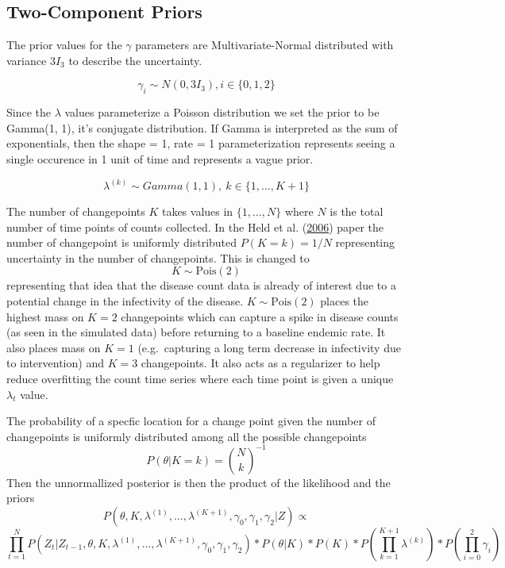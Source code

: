 \documentclass[11pt,a4paper]{article}
\numberwithin{equation}{section}
\begin{document}
\hypertarget{two-component-priors}{%
\subsection{Two-Component Priors}\label{two-component-priors}}

The prior values for the \(\gamma\) parameters are Multivariate-Normal
distributed with variance \(3I_3\) to describe the uncertainty.

\[\gamma_i \sim N(0, 3I_3), i \in \{0,1,2\}\]

Since the \(\lambda\) values parameterize a Poisson distribution we set
the prior to be Gamma(1, 1), it's conjugate distribution. If Gamma is
interpreted as the sum of exponentials, then the shape = 1, rate = 1
parameterization represents seeing a single occurence in 1 unit of time
and represents a vague prior.

\[ \lambda^{(k)} \sim Gamma(1, 1),\ k \in \{1, \dots, K + 1\} \]

The number of changepoints \(K\) takes values in \(\{1,\dots,N\}\) where
\(N\) is the total number of time points of counts collected. In the
Held et al. (\protect\hyperlink{ref-held_two-component_2006}{2006})
paper the number of changepoint is uniformly distributed
\(P(K = k) = 1/N\) representing uncertainty in the number of
changepoints. This is changed to \[K \sim \text{Pois}(2)\] representing
that idea that the disease count data is already of interest due to a
potential change in the infectivity of the disease.
\(K \sim\text{Pois}(2)\) places the highest mass on \(K = 2\)
changepoints which can capture a spike in disease counts (as seen in the
simulated data) before returning to a baseline endemic rate. It also
places mass on \(K = 1\) (e.g.~capturing a long term decrease in
infectivity due to intervention) and \(K = 3\) changepoints. It also
acts as a regularizer to help reduce overfitting the count time series
where each time point is given a unique \(\lambda_t\) value.

The probability of a specfic location for a change point given the
number of changepoints is uniformly distributed among all the possible
changepoints \[P(\theta|K=k) = \binom{N}{k}^{-1}\] Then the
unnormallized posterior is then the product of the likelihood and the
priors
\[ P(\theta, K, \lambda^{(1)}, \dots, \lambda^{(K+1)}, \gamma_0, \gamma_1, \gamma_2|Z)  \propto \]
\[\prod_{t=1}^N P(Z_t|Z_{t-1},\theta, K, \lambda^{(1)}, \dots, \lambda^{(K+1)}, \gamma_0, \gamma_1, \gamma_2)*P(\theta|K)*P(K)*P(\prod_{k=1}^{K+1}\lambda^{(k)} )*P(\prod_{i=0}^2 \gamma_i)  \]
\end{document}
